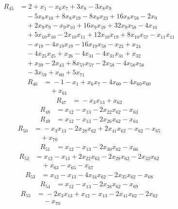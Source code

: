 \begin{align*}
R_{45}&={}2 +x_{1} -x_{6}x_{7} +3x_{8} -3x_{8}x_{9}\\
&\quad{}-5x_{8}x_{10} +8x_{8}x_{19} -8x_{8}x_{23} +16x_{8}x_{58} -2x_{9}\\
&\quad{}+2x_{9}x_{9} -x_{9}x_{10} +16x_{9}x_{19} +32x_{9}x_{58} -4x_{10}\\
&\quad{}+5x_{10}x_{10} -2x_{10}x_{11} +12x_{10}x_{19} +8x_{10}x_{57} -x_{11}x_{11}\\
&\quad{}-x_{19} -4x_{19}x_{19} -16x_{19}x_{58} -x_{23} +x_{24}\\
&\quad{}-4x_{25}x_{25} +x_{26} -4x_{31} -4x_{31}x_{31} +x_{32}\\
&\quad{}+x_{39} -2x_{43} +8x_{57}x_{57} -2x_{58} -4x_{58}x_{58}\\
&\quad{}-3x_{59} +x_{60} +5x_{71}
\end{align*}
\begin{align*}
R_{46}&={}-1 -x_{1} +x_{6}x_{7} -4x_{60} -4x_{60}x_{60}\\
&\quad{}+x_{61}
\end{align*}
\begin{align*}
R_{47}&={}-x_{3}x_{13} +x_{62}
\end{align*}
\begin{align*}
R_{48}&={}x_{12} -x_{13} -2x_{22}x_{62} -x_{63}
\end{align*}
\begin{align*}
R_{49}&={}x_{12} -x_{13} -2x_{26}x_{62} -x_{64}
\end{align*}
\begin{align*}
R_{50}&={}-x_{3}x_{13} -2x_{28}x_{62} +2x_{41}x_{62} -x_{62} -x_{65}\\
&\quad{}+x_{70}
\end{align*}
\begin{align*}
R_{51}&={}x_{12} -x_{13} -2x_{30}x_{62} -x_{66}
\end{align*}
\begin{align*}
R_{52}&={}x_{12} -x_{13} +2x_{22}x_{62} -2x_{28}x_{62} -2x_{32}x_{62}\\
&\quad{}+x_{63} -x_{65} -x_{67}
\end{align*}
\begin{align*}
R_{53}&={}x_{12} -x_{13} -4x_{34}x_{62} -2x_{35}x_{62} -x_{68}
\end{align*}
\begin{align*}
R_{54}&={}x_{12} -x_{13} -2x_{38}x_{62} -x_{69}
\end{align*}
\begin{align*}
R_{55}&={}-2x_{3}x_{13} +x_{12} -x_{13} -2x_{41}x_{62} -2x_{62}\\
&\quad{}-x_{70}
\end{align*}
